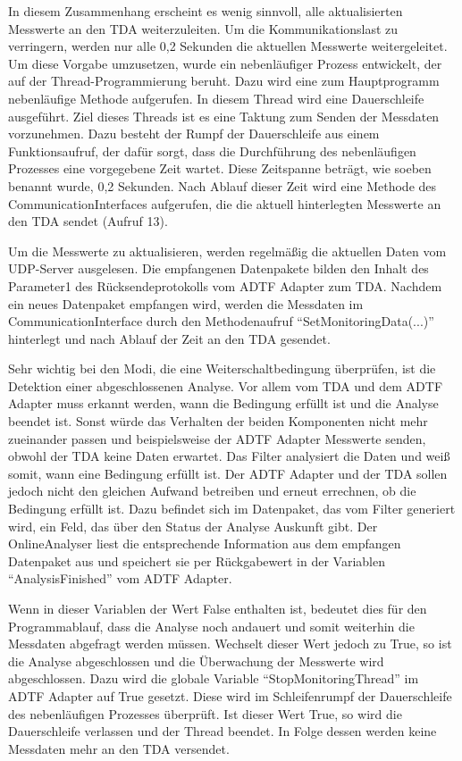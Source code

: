 \documentclass[12pt,a4paper]{report}
\begin{document}
In diesem Zusammenhang erscheint es wenig sinnvoll, alle aktualisierten Messwerte an den TDA weiterzuleiten. Um die Kommunikationslast zu verringern, werden nur alle 0,2 Sekunden die aktuellen Messwerte weitergeleitet.  Um diese Vorgabe umzusetzen, wurde ein nebenläufiger Prozess entwickelt, der auf der Thread-Programmierung beruht. Dazu wird eine zum Hauptprogramm nebenläufige Methode aufgerufen. In diesem Thread wird eine Dauerschleife ausgeführt. Ziel dieses Threads ist es eine Taktung zum Senden der Messdaten vorzunehmen. Dazu besteht der Rumpf der Dauerschleife aus einem Funktionsaufruf, der dafür sorgt, dass die Durchführung des nebenläufigen Prozesses eine vorgegebene Zeit wartet. Diese Zeitspanne beträgt, wie soeben benannt wurde, 0,2 Sekunden. Nach Ablauf dieser Zeit wird eine Methode des CommunicationInterfaces aufgerufen, die die aktuell hinterlegten Messwerte an den TDA sendet (Aufruf 13). 

Um die Messwerte zu aktualisieren, werden regelmä\ss ig die aktuellen Daten vom UDP-Server ausgelesen. Die empfangenen Datenpakete bilden den Inhalt des Parameter1 des Rücksendeprotokolls vom ADTF Adapter zum TDA. Nachdem ein neues Datenpaket empfangen wird, werden die Messdaten im CommunicationInterface durch den Methodenaufruf "`SetMonitoringData(...)"' hinterlegt und nach Ablauf der Zeit an den TDA gesendet. 

Sehr wichtig bei den Modi, die eine Weiterschaltbedingung überprüfen, ist die Detektion einer abgeschlossenen Analyse. Vor allem vom TDA und dem ADTF Adapter muss erkannt werden, wann die Bedingung erfüllt ist und die Analyse beendet ist. Sonst würde das Verhalten der beiden Komponenten nicht mehr zueinander passen und beispielsweise der ADTF Adapter Messwerte senden, obwohl der TDA keine Daten erwartet. Das Filter analysiert die Daten und weiß somit, wann eine Bedingung erfüllt ist. Der ADTF Adapter und der TDA sollen jedoch nicht den gleichen Aufwand betreiben und erneut errechnen, ob die Bedingung erfüllt ist. Dazu befindet sich im Datenpaket, das vom Filter generiert wird, ein Feld, das über den Status der Analyse Auskunft gibt. Der OnlineAnalyser liest die entsprechende Information aus dem empfangen Datenpaket aus und speichert sie per Rückgabewert in der Variablen "`AnalysisFinished"' vom ADTF Adapter. 

Wenn in dieser Variablen der Wert False enthalten ist, bedeutet dies für den Programmablauf, dass die Analyse noch andauert und somit weiterhin die Messdaten abgefragt werden müssen. Wechselt dieser Wert jedoch zu True, so ist die Analyse abgeschlossen und die Überwachung der Messwerte wird abgeschlossen. Dazu wird die globale Variable "`StopMonitoringThread"' im ADTF Adapter auf True gesetzt. Diese wird im Schleifenrumpf der Dauerschleife des nebenläufigen Prozesses überprüft. Ist dieser Wert True, so wird die Dauerschleife verlassen und der Thread beendet. In Folge dessen werden keine Messdaten mehr an den TDA versendet.
\end{document}
